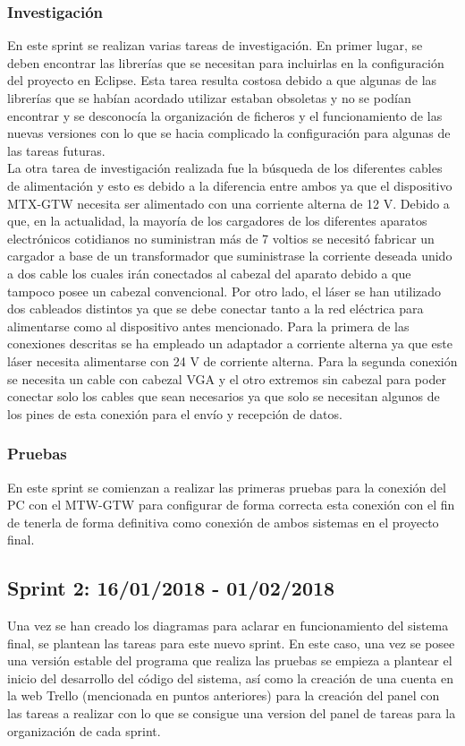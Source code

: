 \subsubsection{Investigación}
En este sprint se realizan varias tareas de investigación. En primer lugar, se deben encontrar las librerías que se necesitan para incluirlas en la configuración del proyecto en Eclipse. Esta tarea resulta costosa debido a que algunas de las librerías que se habían acordado utilizar estaban obsoletas y no se podían encontrar y se desconocía la organización de ficheros y el funcionamiento de las nuevas versiones con lo que se hacia complicado la configuración para algunas de las tareas futuras.\\
La otra tarea de investigación realizada fue la búsqueda de los diferentes cables de alimentación y esto es debido a la diferencia entre ambos ya que el dispositivo MTX-GTW necesita ser alimentado con una corriente alterna de 12 V. Debido a que, en la actualidad, la mayoría de los cargadores de los diferentes aparatos electrónicos cotidianos no suministran más de 7 voltios se necesitó fabricar un cargador a base de un transformador que suministrase la corriente deseada unido a dos cable los cuales irán conectados al cabezal del aparato debido a que tampoco posee un cabezal convencional. Por otro lado, el láser  se han utilizado dos cableados distintos ya que se debe conectar tanto a la red eléctrica para alimentarse como al dispositivo antes mencionado. Para la primera de las conexiones descritas se ha empleado un adaptador a corriente alterna ya que este láser necesita alimentarse con 24 V de corriente alterna. Para la segunda conexión se necesita un cable con cabezal VGA y el otro extremos sin cabezal para poder conectar solo los cables que sean necesarios ya que solo se necesitan algunos de los pines de esta conexión para el envío y recepción de datos.\\

\subsubsection{Pruebas}
En este sprint se comienzan a realizar las primeras pruebas para la conexión del PC con el MTW-GTW para configurar de forma correcta esta conexión con el fin de tenerla de forma definitiva como conexión de ambos sistemas en el proyecto final.\\

\subsection{Sprint 2: 16/01/2018 - 01/02/2018}
Una vez se han creado los diagramas para aclarar en funcionamiento del sistema final, se plantean las tareas para este nuevo sprint. En este caso, una vez se posee una versión estable del programa que realiza las pruebas se empieza a plantear el inicio del desarrollo del código del sistema, así como la creación de una cuenta en la web Trello (mencionada en puntos anteriores) para la creación del panel con las tareas a realizar con lo que se consigue una version del panel de tareas para la organización de cada sprint.\\
